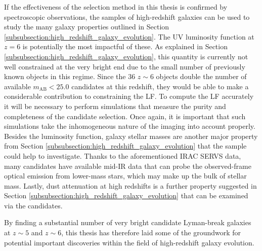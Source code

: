 If the effectiveness of the selection method in this thesis is confirmed by spectroscopic observations, the samples of \DESVIDEO high-redshift galaxies can be used to study the many galaxy properties outlined in Section \ref{subsubsection:high_redshift_galaxy_evolution}. The UV luminosity function at $z=6$ is potentially the most impactful of these. As explained in Section \ref{subsubsection:high_redshift_galaxy_evolution}, this quantity is currently not well constrained at the very bright end due to the small number of previously known objects in this regime. Since the 36 $z\sim6$ \DESVIDEO objects double the number of available $m_{\mathrm{AB}}<25.0$ candidates at this redshift, they would be able to make a considerable contribution to constraining the LF. To compute the \DESVIDEO LF accurately it will be necessary to perform simulations that measure the purity and completeness of the \DESVIDEO candidate selection. Once again, it is important that such simulations take the inhomogeneous nature of the imaging into account properly. Besides the luminosity function, galaxy stellar masses are another major property from Section \ref{subsubsection:high_redshift_galaxy_evolution} that the \DESVIDEO sample could help to investigate. Thanks to the aforementioned IRAC SERVS data, many candidates have available mid-IR data that can probe the observed-frame optical emission from lower-mass stars, which may make up the bulk of stellar mass. Lastly, dust attenuation at high redshifts is a further property suggested in Section \ref{subsubsection:high_redshift_galaxy_evolution} that can be examined via the \DESVIDEO candidates. \par   

By finding a substantial number of very bright candidate Lyman-break galaxies at $z\sim5$ and $z\sim6$, this thesis has therefore laid some of the groundwork for potential important discoveries within the field of high-redshift galaxy evolution. 



